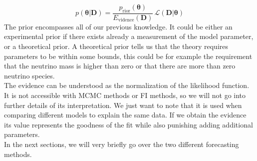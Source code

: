 \documentclass[../main.tex]{subfiles}
\begin{document}
\begin{equation}
    p(\boldsymbol{\theta}|\boldsymbol{D}) = \frac{p_\mathrm{rior}(\boldsymbol{\theta})}{E_\mathrm{vidence}(\boldsymbol{D})}\,\mathcal{L}(\boldsymbol{D}|\boldsymbol{\theta})
\end{equation}
The prior encompasses all of our previous knowledge. It could be either an experimental prior if there exists already a measurement of the model parameter, or a theoretical prior. A theoretical prior tells us that the theory requires parameters to be within some bounds, this could be for example the requirement that the neutrino mass is higher than zero or that there are more than zero neutrino species.\\
The evidence can be understood as the normalization of the likelihood function. It is not accessible with MCMC methods or FI methods, so we will not go into further details of its interpretation. We just want to note that it is used when comparing different models to explain the same data. If we obtain the evidence its value represents the goodness of the fit while also punishing adding additional parameters.\\
In the next sections, we will very briefly go over the two different forecasting methods.  
\end{document}
